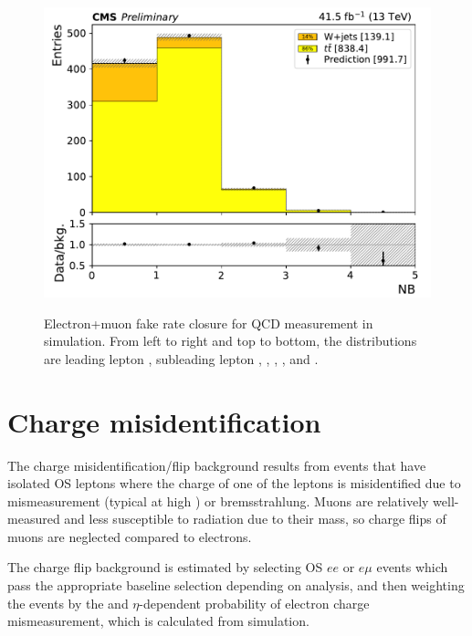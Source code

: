 \begin{figure}[!hbtp]
  \includegraphics[width=.45\textwidth]{figs/ssan/fakerate/application/y2017/y2017_NB.pdf} \\
  \caption{ Electron+muon fake rate closure for QCD measurement in simulation.
  From left to right and top to bottom, the distributions are leading lepton \pt, subleading lepton \pt,
  \HT, \ptmiss, \Njets, and \Nbjets.}
  \label{fig:QCDFakesAll2017}
  \end{figure}

\FloatBarrier

\section{Charge misidentification}

The charge misidentification/flip background results from events that have
isolated OS leptons where the charge of one of the leptons is
misidentified due to mismeasurement (typical at high \pt) or bremsstrahlung.
Muons are relatively well-measured and less susceptible to radiation due to their
mass, so charge flips of muons are neglected compared to electrons.

The charge flip background is estimated by selecting OS $ee$ or $e\mu$ events 
which pass the appropriate baseline selection depending on analysis,
and then weighting the events by the \pt and $\eta$-dependent 
probability of electron charge mismeasurement, which is calculated from simulation.


